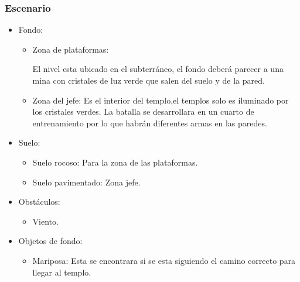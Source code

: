 \documentclass[11pt,letterpaper]{article}
\begin{document}
\begin{itemize}
\subsubsection{Escenario}
\begin{itemize} 
        \item Fondo:
                \begin{itemize}
                        \item Zona de plataformas:
\\
\par
El nivel esta ubicado en el subterráneo, el fondo deberá parecer a una mina con cristales de luz verde que salen del suelo y de la pared.
                        \item Zona del jefe:
Es el interior del templo,el templos solo es iluminado por los cristales verdes. La batalla se desarrollara en un cuarto de entrenamiento por lo que habrán diferentes armas en las paredes.
                \end{itemize}
        \item Suelo:
                \begin{itemize}
                        \item Suelo rocoso: Para la zona de las plataformas.
                        \item Suelo pavimentado: Zona jefe.
                \end{itemize}
	  \item Obstáculos:
                \begin{itemize}
                        \item Viento.
                \end{itemize}
        \item Objetos de fondo:
                \begin{itemize}
                        \item Mariposa: Esta se encontrara si se esta siguiendo el camino correcto para llegar al templo.
                \end{itemize}
\end{itemize}   


\end{itemize}
\end{document}
